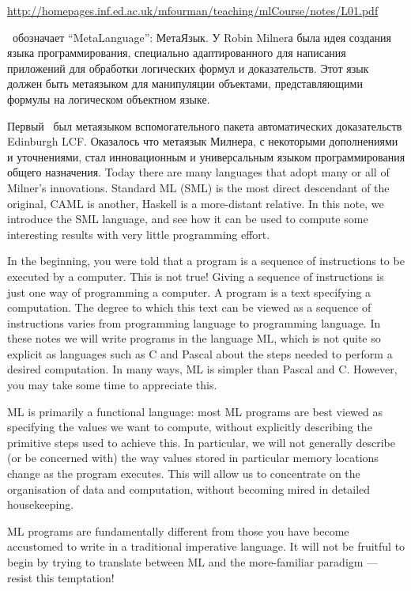 \secdown

\url{http://homepages.inf.ed.ac.uk/mfourman/teaching/mlCourse/notes/L01.pdf}


\ml\ обозначает “MetaLanguage”: МетаЯзык. У Robin Milnerа была идея создания
языка программирования, специально адаптированного для написания приложений для
обработки логических формул и доказательств. Этот язык должен быть метаязыком
для манипуляции объектами, представляющими формулы на логическом объектном
языке.

Первый \ml\ был метаязыком вспомогательного пакета автоматических доказательств
Edinburgh LCF. Оказалось что метаязык Милнера, с некоторыми дополнениями и
уточнениями, стал инновационным и универсальным языком программирования общего
назначения. Today there are many languages that adopt many or all of Milner’s
innovations. Standard ML (SML) is the most direct descendant of the original,
CAML is another, Haskell is a more-distant relative. In this note, we introduce
the SML language, and see how it can be used to compute some interesting results
with very little programming effort.

In the beginning, you were told that a program is a sequence of instructions
to be executed by a computer. This is not true! Giving a sequence of
instructions is just one way of programming a computer. A program is a text
specifying a computation. The degree to which this text can be viewed as a
sequence of instructions varies from programming language to programming
language. In these notes we will write programs in the language ML, which
is not quite so explicit as languages such as C and Pascal about the steps
needed to perform a desired computation. In many ways, ML is simpler than
Pascal and C. However, you may take some time to appreciate this.

ML is primarily a functional language: most ML programs are best viewed
as specifying the values we want to compute, without explicitly describing
the primitive steps used to achieve this. In particular, we will not generally
describe (or be concerned with) the way values stored in particular memory
locations change as the program executes. This will allow us to concentrate
on the organisation of data and computation, without becoming mired in
detailed housekeeping.

ML programs are fundamentally different from those you have become
accustomed to write in a traditional imperative language. It will not be
fruitful to begin by trying to translate between ML and the more-familiar
paradigm — resist this temptation!

